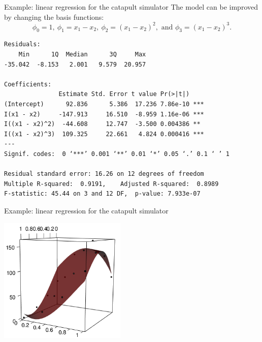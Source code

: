 \documentclass{beamer}
\begin{document}
\begin{frame}[fragile]{}
\begin{exampleblock}{Example: linear regression for the catapult simulator}
The model can be improved by changing the basis functions:
 $$\phi_0 = 1,\ \phi_1 = x_1-x_2,\ \phi_2 = (x_1-x_2)^2,\text{ and } \phi_3 = (x_1-x_2)^3.$$
{\footnotesize
\begin{verbatim}
Residuals:
    Min      1Q  Median      3Q     Max 
-35.042  -8.153   2.001   9.579  20.957 

Coefficients:
               Estimate Std. Error t value Pr(>|t|)    
(Intercept)      92.836      5.386  17.236 7.86e-10 ***
I(x1 - x2)     -147.913     16.510  -8.959 1.16e-06 ***
I((x1 - x2)^2)  -44.608     12.747  -3.500 0.004386 ** 
I((x1 - x2)^3)  109.325     22.661   4.824 0.000416 ***
---
Signif. codes:  0 ‘***’ 0.001 ‘**’ 0.01 ‘*’ 0.05 ‘.’ 0.1 ‘ ’ 1

Residual standard error: 16.26 on 12 degrees of freedom
Multiple R-squared:  0.9191,	Adjusted R-squared:  0.8989 
F-statistic: 45.44 on 3 and 12 DF,  p-value: 7.933e-07
\end{verbatim}
}
\end{exampleblock}
\end{frame}

\begin{frame}{}
\begin{exampleblock}{Example: linear regression for the catapult simulator}
\begin{center}
\includegraphics[height=6cm]{figures/R/linReg_model2.png}
\end{center}
\end{exampleblock}
\end{frame}
\end{document}
